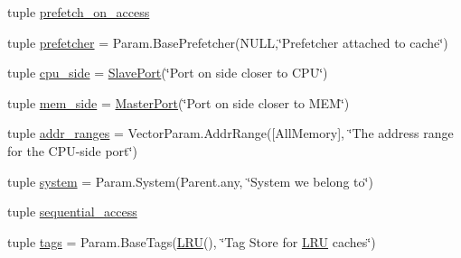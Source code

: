\begin{DoxyCompactItemize}
\item 
tuple \hyperlink{classBaseCache_1_1BaseCache_a53a99d890ac829666ac272f59ceabdff}{prefetch\_\-on\_\-access}
\item 
tuple \hyperlink{classBaseCache_1_1BaseCache_a7fc8a097fde225fa0218465029ad22d5}{prefetcher} = Param.BasePrefetcher(NULL,\char`\"{}Prefetcher attached to cache\char`\"{})
\item 
tuple \hyperlink{classBaseCache_1_1BaseCache_aba2a6f360ad513aac2a909e979db565c}{cpu\_\-side} = \hyperlink{classSlavePort}{SlavePort}(\char`\"{}Port on side closer to CPU\char`\"{})
\item 
tuple \hyperlink{classBaseCache_1_1BaseCache_a4753243a6eb570c8aca99d06979cddee}{mem\_\-side} = \hyperlink{classMasterPort}{MasterPort}(\char`\"{}Port on side closer to MEM\char`\"{})
\item 
tuple \hyperlink{classBaseCache_1_1BaseCache_aa330ef4ab6a08f4d5d28427274cd4f68}{addr\_\-ranges} = VectorParam.AddrRange(\mbox{[}AllMemory\mbox{]}, \char`\"{}The address range for the CPU-\/side port\char`\"{})
\item 
tuple \hyperlink{classBaseCache_1_1BaseCache_ab737471139f5a296e5b26e8a0e1b0744}{system} = Param.System(Parent.any, \char`\"{}System we belong to\char`\"{})
\item 
tuple \hyperlink{classBaseCache_1_1BaseCache_a0545f3dc4d67873176d4d70d4618e078}{sequential\_\-access}
\item 
tuple \hyperlink{classBaseCache_1_1BaseCache_ae056df42c3ab581ce6db9f061a5695f0}{tags} = Param.BaseTags(\hyperlink{classLRU}{LRU}(), \char`\"{}Tag Store for \hyperlink{classLRU}{LRU} caches\char`\"{})
\end{DoxyCompactItemize}


